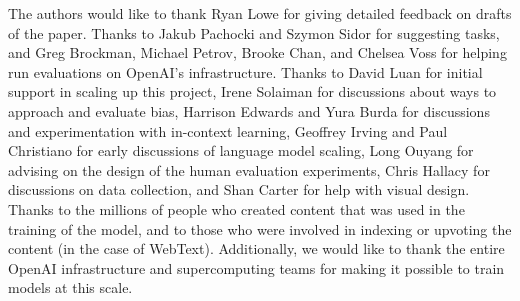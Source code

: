 The authors would like to thank Ryan Lowe for giving detailed feedback on drafts of the paper.  Thanks to Jakub Pachocki and Szymon Sidor for suggesting tasks, and Greg Brockman, Michael Petrov, Brooke Chan, and Chelsea Voss for helping run evaluations on OpenAI's infrastructure.  Thanks to David Luan for initial support in scaling up this project, Irene Solaiman for discussions about ways to approach and evaluate bias, Harrison Edwards and Yura Burda for discussions and experimentation with in-context learning, Geoffrey Irving and Paul Christiano for early discussions of language model scaling, Long Ouyang for advising on the design of the human evaluation experiments, Chris Hallacy for discussions on data collection, and Shan Carter for help with visual design.  Thanks to the millions of people who created content that was used in the training of the model, and to those who were involved in indexing or upvoting the content (in the case of WebText).  Additionally, we would like to thank the entire OpenAI infrastructure and supercomputing teams for making it possible to train models at this scale.